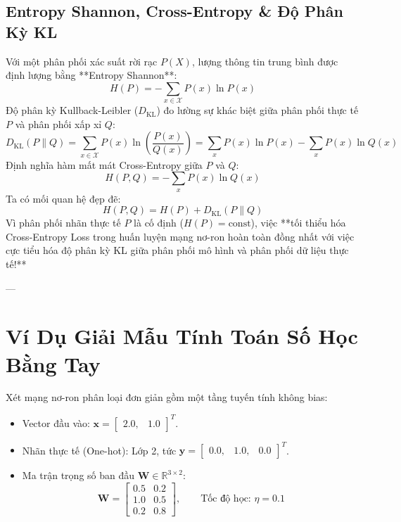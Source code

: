 \subsection{Entropy Shannon, Cross-Entropy \& Độ Phân Kỳ KL}
Với một phân phối xác suất rời rạc $P(X)$, lượng thông tin trung bình được định lượng bằng **Entropy Shannon**:
\begin{equation}
H(P) = -\sum_{x \in \mathcal{X}} P(x) \ln P(x)
\end{equation}
Độ phân kỳ Kullback-Leibler ($D_{\text{KL}}$) đo lường sự khác biệt giữa phân phối thực tế $P$ và phân phối xấp xỉ $Q$:
\begin{equation}
D_{\text{KL}}(P \parallel Q) = \sum_{x \in \mathcal{X}} P(x) \ln \left( \frac{P(x)}{Q(x)} \right) = \sum_{x} P(x) \ln P(x) - \sum_{x} P(x) \ln Q(x)
\end{equation}
Định nghĩa hàm mất mát Cross-Entropy giữa $P$ và $Q$:
\begin{equation}
H(P, Q) = -\sum_{x} P(x) \ln Q(x)
\end{equation}
Ta có mối quan hệ đẹp đẽ:
\begin{equation}
H(P, Q) = H(P) + D_{\text{KL}}(P \parallel Q)
\end{equation}
Vì phân phối nhãn thực tế $P$ là cố định ($H(P) = \text{const}$), việc **tối thiểu hóa Cross-Entropy Loss trong huấn luyện mạng nơ-ron hoàn toàn đồng nhất với việc cực tiểu hóa độ phân kỳ KL giữa phân phối mô hình và phân phối dữ liệu thực tế!**

---

\section{Ví Dụ Giải Mẫu Tính Toán Số Học Bằng Tay}
\label{sec:ch04-numerical-walkthrough}

\begin{example}
Xét mạng nơ-ron phân loại đơn giản gồm một tầng tuyến tính không bias:
\begin{itemize}
  \item Vector đầu vào: $\mathbf{x} = \begin{bmatrix} 2.0, & 1.0 \end{bmatrix}^T$.
  \item Nhãn thực tế (One-hot): Lớp 2, tức $\mathbf{y} = \begin{bmatrix} 0.0, & 1.0, & 0.0 \end{bmatrix}^T$.
  \item Ma trận trọng số ban đầu $\mathbf{W} \in \mathbb{R}^{3 \times 2}$:
  \begin{equation*}
  \mathbf{W} = \begin{bmatrix} 0.5 & 0.2 \\ 1.0 & 0.5 \\ 0.2 & 0.8 \end{bmatrix}, \qquad \text{Tốc độ học: } \eta = 0.1
  \end{equation*}
\end{itemize}
\end{example}


